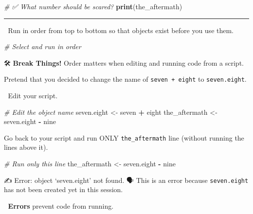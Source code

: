 \documentclass[
  12pt,
]{scrreprt}
\newenvironment{Shaded}{\begin{snugshade}}{\end{snugshade}}
\newcommand{\CommentTok}[1]{\textcolor[rgb]{0.56,0.35,0.01}{\textit{#1}}}
\newcommand{\FunctionTok}[1]{\textcolor[rgb]{0.13,0.29,0.53}{\textbf{#1}}}
\newcommand{\NormalTok}[1]{#1}
\newcommand{\OtherTok}[1]{\textcolor[rgb]{0.56,0.35,0.01}{#1}}
\newcommand{\SpecialCharTok}[1]{\textcolor[rgb]{0.81,0.36,0.00}{\textbf{#1}}}
\begin{document}
\begin{Shaded}
\begin{Highlighting}[]
\CommentTok{\# ✅ What number should be scared?}
\FunctionTok{print}\NormalTok{(the\_aftermath)}
\end{Highlighting}
\end{Shaded}

\begin{center}\rule{0.5\linewidth}{0.5pt}\end{center}

🎯 Run in order from top to bottom so that objects exist before you use
them.

\begin{Shaded}
\begin{Highlighting}[]
\CommentTok{\# Select and run in order}
\end{Highlighting}
\end{Shaded}

🛠 \textbf{Break Things!} Order matters when editing and running code
from a script.

Pretend that you decided to change the name of \texttt{seven\ +\ eight}
to \texttt{seven.eight}.

🎯 Edit your script.

\begin{Shaded}
\begin{Highlighting}[]
\CommentTok{\# Edit the object name}
\NormalTok{seven.eight }\OtherTok{\textless{}{-}}\NormalTok{ seven }\SpecialCharTok{+}\NormalTok{ eight}
\NormalTok{the\_aftermath }\OtherTok{\textless{}{-}}\NormalTok{ seven.eight }\SpecialCharTok{{-}}\NormalTok{ nine}
\end{Highlighting}
\end{Shaded}

Go back to your script and run ONLY \texttt{the\_aftermath} line
(without running the lines above it).

\begin{Shaded}
\begin{Highlighting}[]
\CommentTok{\# Run only this line}
\NormalTok{the\_aftermath }\OtherTok{\textless{}{-}}\NormalTok{ seven.eight }\SpecialCharTok{{-}}\NormalTok{ nine}
\end{Highlighting}
\end{Shaded}

✍️ Error: object `seven.eight' not found. 🗣 This is an error because
\texttt{seven.eight} has not been created yet in this session.

🚧 \textbf{Errors} prevent code from running.
\end{document}
